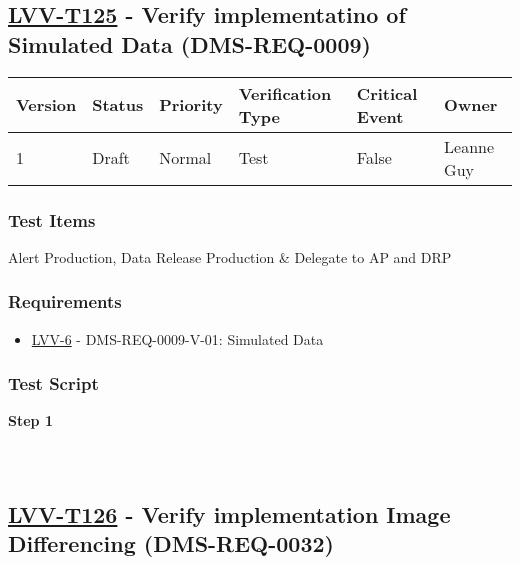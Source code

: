 \hypertarget{lvv-t125---verify-implementatino-of-simulated-data-dms-req-0009}{%
\subsection{\texorpdfstring{\href{https://jira.lsstcorp.org/secure/Tests.jspa\#/testCase/LVV-T125}{LVV-T125}
- Verify implementatino of Simulated Data
(DMS-REQ-0009)}{LVV-T125 - Verify implementatino of Simulated Data (DMS-REQ-0009)}}\label{lvv-t125---verify-implementatino-of-simulated-data-dms-req-0009}}

\begin{longtable}[]{@{}llllll@{}}
\toprule
Version & Status & Priority & Verification Type & Critical Event &
Owner\tabularnewline
\midrule
\endhead
1 & Draft & Normal & Test & False & Leanne Guy\tabularnewline
\bottomrule
\end{longtable}

\hypertarget{test-items-101}{%
\subsubsection{Test Items}\label{test-items-101}}

Alert Production, Data Release Production \& Delegate to AP and DRP

\hypertarget{requirements-102}{%
\subsubsection{Requirements}\label{requirements-102}}

\begin{itemize}
\tightlist
\item
  \href{https://jira.lsstcorp.org/browse/LVV-6}{LVV-6} -
  DMS-REQ-0009-V-01: Simulated Data
\end{itemize}

\hypertarget{test-script-102}{%
\subsubsection{Test Script}\label{test-script-102}}

\textbf{Step 1}\\
~\\
~\\

\hypertarget{lvv-t126---verify-implementation-image-differencing-dms-req-0032}{%
\subsection{\texorpdfstring{\href{https://jira.lsstcorp.org/secure/Tests.jspa\#/testCase/LVV-T126}{LVV-T126}
- Verify implementation Image Differencing
(DMS-REQ-0032)}{LVV-T126 - Verify implementation Image Differencing (DMS-REQ-0032)}}\label{lvv-t126---verify-implementation-image-differencing-dms-req-0032}}

